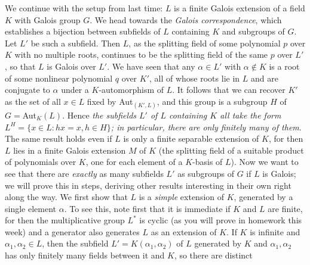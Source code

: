 We continue with the setup from last time:  $L$ is a finite Galois extension of a field $K$ with Galois group $G$.  We head towards the {\sl Galois correspondence}, which establishes a bijection between subfields of $L$ containing $K$ and subgroups of $G$.  Let $L'$ be such a subfield.  Then $L$, as the splitting field of some polynomial $p$ over $K$ with no multiple roots, continues to be the splitting field of the same $p$ over $L'$, so that $L$ is Galois over $L'$.  We have seen that any
$\alpha\in L'$ with $\alpha\notin K$ is a root of some nonlinear polynomial $q$ over $K'$, all of whose roots lie in $L$ and are conjugate to $\alpha$ under a $K$-automorphism of $L$.  It follows that we can recover $K'$ as the set of all $x\in L$ fixed by Aut$_(K',L)$, and this group is a subgroup $H$ of
$G=$Aut$_K(L)$.  Hence {\sl the subfields $L'$ of $L$ containing $K$ all take the form
$L^H = \{x\in L: hx = x, h\in H\}$; in particular, there are only finitely many of them}.  The same result holds even if $L$ is only a finite separable extension of $K$, for then $L$ lies in a finite Galois extension $M$ of $K$ (the splitting field of a suitable product of polynomials over $K$, one for each element of a $K$-basis of $L$).  Now we want to see that there are {\sl exactly} as many subfields $L'$ as subgroups of $G$ if $L$ is Galois; we will prove this in steps, deriving other results interesting in their own right along the way.  We first show that $L$ is a {\sl simple} extension of $K$, generated by a single element $\alpha$.  To see this, note first that it is immediate if $K$ and $L$ are finite, for then the multiplicative group $L^*$ is cyclic (as you will prove in homework this week) and a generator also generates $L$ as an extension of $K$.  If $K$ is infinite and $\alpha_1,\alpha_2\in L$, then the subfield $L'=K(\alpha_1,\alpha_2)$ of $L$ generated by $K$ and $\alpha_1,\alpha_2$ has only finitely many fields between it and $K$, so there are distinct
